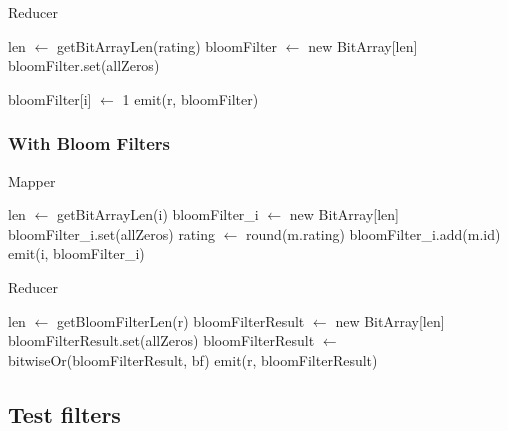 \begin{algorithm}[H]
	\caption{Reducer} 
	\begin{algorithmic}[1]
		\State len $\gets$ getBitArrayLen(rating)
		\State bloomFilter $\gets$ new BitArray[len]
		\State bloomFilter.set(allZeros)
		
				\State bloomFilter[i] $\gets$ 1
			\EndFor
		\EndFor
		emit(r, bloomFilter)
		\EndProcedure
	\end{algorithmic} 
\end{algorithm}

\subsubsection{With Bloom Filters}

\begin{algorithm}[H]
	\caption{Mapper} 
	\begin{algorithmic}[1]
			\hfill {}
				\State len $\gets$ getBitArrayLen(i)
				\State bloomFilter\_i $\gets$ new BitArray[len]
				\State bloomFilter\_i.set(allZeros)
			\EndFor
				\State rating $\gets$ round(m.rating)
				\State bloomFilter\_i.add(m.id)
			\EndFor
				\State emit(i, bloomFilter\_i)			
			\EndFor
		\EndProcedure
	\end{algorithmic} 
\end{algorithm}

\begin{algorithm}[H]
	\caption{Reducer} 
	\begin{algorithmic}[1]
		\State len $\gets$ getBloomFilterLen(r)
		\State bloomFilterResult $\gets$ new BitArray[len]
		\State bloomFilterResult.set(allZeros)
			\State bloomFilterResult $\gets$ bitwiseOr(bloomFilterResult, bf)
		\EndFor
		\State emit(r, bloomFilterResult)
		\EndProcedure
	\end{algorithmic} 
\end{algorithm}

\subsection{Test filters}

